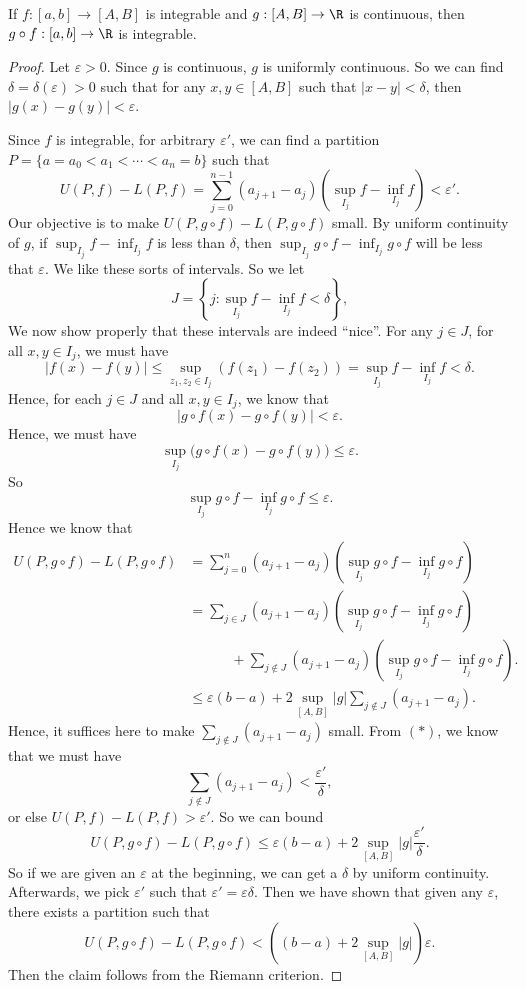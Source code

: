 \documentclass[a4paper]{article}
\begin{document}
\begin{thm}
  If $f: [a, b] \to [A, B]$ is integrable and $g: [A, B] \to \R$ is continuous, then $g\circ f: [a, b] \to \R$ is integrable.
\end{thm}

\begin{proof}
  Let $\varepsilon > 0$. Since $g$ is continuous, $g$ is uniformly continuous. So we can find $\delta = \delta(\varepsilon) > 0$ such that for any $x, y\in [A, B]$ such that $|x - y| < \delta$, then $|g(x) - g(y)| < \varepsilon$.

  Since $f$ is integrable, for arbitrary $\varepsilon'$, we can find a partition $P = \{a = a_0 < a_1 < \cdots < a_n = b\}$ such that
  \[
    U(P, f) - L(P, f) = \sum_{j = 0}^{n - 1} (a_{j + 1} - a_j) \left(\sup_{I_j} f - \inf_{I_j} f\right) < \varepsilon'. \tag{$*$}
  \]
  Our objective is to make $U(P, g\circ f) - L(P, g\circ f)$ small. By uniform continuity of $g$, if $\sup_{I_j} f - \inf_{I_j} f$ is less than $\delta$, then $\sup_{I_j} g\circ f - \inf_{I_j} g\circ f$ will be less that $\varepsilon$. We like these sorts of intervals. So we let
  \[
    J = \left\{j: \sup_{I_j} f - \inf_{I_j}f < \delta\right\},
  \]
  We now show properly that these intervals are indeed ``nice''. For any $j \in J$, for all $x, y\in I_j$, we must have
  \[
    |f(x) - f(y)| \leq \sup_{z_1, z_2\in I_j} (f(z_1) - f(z_2)) = \sup_{I_j} f - \inf_{I_j} f < \delta.
  \]
  Hence, for each $j\in J$ and all $x, y\in I_j$, we know that
  \[
    |g\circ f(x) - g\circ f(y)| < \varepsilon.
  \]
  Hence, we must have
  \[
    \sup_{I_j} \Big(g\circ f(x) - g\circ f(y)\Big) \leq \varepsilon.
  \]
  So
  \[
    \sup_{I_j} g\circ f - \inf_{I_j} g\circ f \leq \varepsilon.
  \]
  Hence we know that
  \begin{align*}
    U(P, g\circ f) - L(P, g\circ f) &= \sum_{j = 0}^n (a_{j + 1} - a_j) \left(\sup_{I_j}g\circ f - \inf_{I_j}g\circ f\right)\\
    &= \sum_{j \in J} (a_{j + 1} - a_j) \left(\sup_{I_j}g\circ f - \inf_{I_j}g\circ f\right) \\
    &\quad\quad\quad+ \sum_{j \not\in J} (a_{j + 1} - a_j)\left(\sup_{I_j}g\circ f - \inf_{I_j}g\circ f\right).\\
    &\leq \varepsilon(b - a) + 2\sup_{[A, B]}|g| \sum_{j\not\in J}(a_{j + 1} - a_j).
  \end{align*}
  Hence, it suffices here to make $\sum\limits_{j\not\in J} (a_{j + 1} - a_j)$ small. From $(*)$, we know that we must have
  \[
    \sum_{j \not\in J} (a_{j + 1} - a_j) < \frac{\varepsilon'}{\delta},
  \]
  or else $U(P, f) - L(P, f) > \varepsilon'$. So we can bound
  \[
    U(P, g\circ f) - L(P, g\circ f) \leq \varepsilon(b - a) + 2\sup_{[A, B]} |g| \frac{\varepsilon'}{\delta}.
  \]
  So if we are given an $\varepsilon$ at the beginning, we can get a $\delta$ by uniform continuity. Afterwards, we pick $\varepsilon'$ such that $\varepsilon' = \varepsilon \delta$. Then we have shown that given any $\varepsilon$, there exists a partition such that
  \[
    U(P, g\circ f) - L(P, g\circ f) < \left((b - a) + 2\sup_{[A, B]} |g|\right) \varepsilon.
  \]
  Then the claim follows from the Riemann criterion.
\end{proof}
\end{document}
